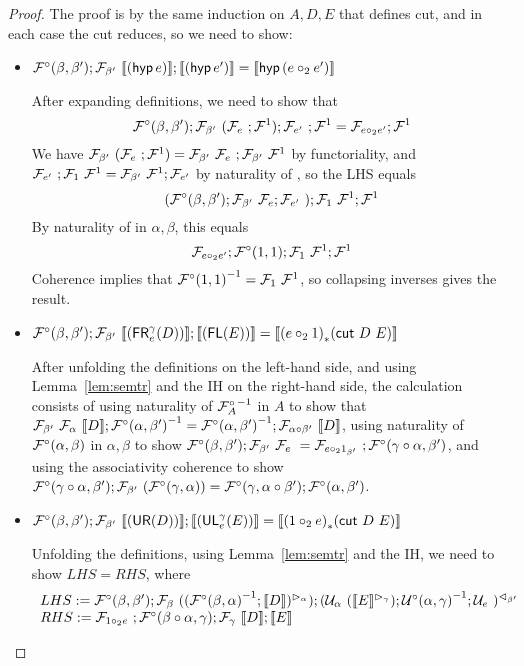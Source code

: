 \documentclass{drl-common/llncs}
\renewcommand{\sem}[1]{\ensuremath{ \llbracket #1 \rrbracket}}
\newcommand{\inv}[1]{\ensuremath{{#1}^{-1}}}
\newcommand\compo[2]{\ensuremath{#1 \circ #2}}
\newcommand\comph[2]{\ensuremath{#1 \mathbin{\circ_2} #2}}
\newcommand\tr[2]{\ensuremath{{{#1}_{*}(#2)}}}
\newcommand\cutsym{\ensuremath{\dsd{cut}}}
\newcommand\cut[2]{\ensuremath{{\cutsym \,\, #1 \,\, #2}}}
\newcommand\hyp[1]{\ensuremath{\dsd{hyp} \, {#1}}}
\newcommand\UL[3]{\ensuremath{\dsd{UL}^{#1}_{#2}(#3)}}
\newcommand\FR[3]{\ensuremath{\dsd{FR}^{#1}_{#2}(#3)}}
\newcommand\FL[1]{\ensuremath{\dsd{FL}(#1)}}
\newcommand\UR[1]{\ensuremath{\dsd{UR}(#1)}}
\begin{document}
\begin{proof}

The proof is by the same induction on $A,D,E$ that defines cut, and in
each case the cut reduces, so we need to show:

\begin{itemize}
\item $\semofcut {(\hyp e)} {(\hyp {e'})} = \sem{\hyp {(\comph{e}{e'})}}$

After expanding definitions, we need to show that
\[
\semFcomp(\beta,\beta');\semF{\beta'}{(\semF{e};\semFone)};\semF{e'};\semFone = \semFo{\comph{e}{e'}};\semFone
\]
We have $\mathcal{F}_{\beta'} \,\, (\mathcal{F}_{e} \,\, ;{\mathcal{F}^1}) =
\mathcal{F}_{\beta'} \,\, \mathcal{F}_{e} \,\, ;\mathcal{F}_{\beta'} \,\, {\mathcal{F}^1}$ by functoriality, and $\mathcal{F}_{e'} \,\, ;{\mathcal{F}_{1} \,\, {\mathcal{F}^1}} =
\mathcal{F}_{\beta'} \,\, {\mathcal{F}^1};{\mathcal{F}_{e'}}$ by naturality of ,
so the LHS equals
\[
(\mathcal{F}^\circ(\beta,\beta');\mathcal{F}_{\beta'} \,\, {\mathcal{F}_{e}};\mathcal{F}_{e'} \,\, );{\mathcal{F}_{1} \,\, {\mathcal{F}^1}};{\mathcal{F}^1}
\]
By naturality of \semFcomp in $\alpha,\beta$, this equals
\[
\semFo{\comph{e}{e'}};\semFcomp(1,1);{\semF{1}{\semFone}};\semFone
\]
Coherence implies that $\inv{\semFcomp(1,1)} = \semF{1}{\semFone}$, so
collapsing inverses gives the result.  

\item $\semofcut {(\FR \gamma e D)} {(\FL E)} = \sem{ \tr {(\comph{e}{1})} {\cut D E} }$

After unfolding the definitions on the left-hand side, and using
Lemma~\ref{lem:semtr} and the IH on the right-hand side, 
the calculation consists of using naturality of $\inv{\semFcomp_A}$ in $A$ to
show that $\semF{\beta'}{\semF{\alpha}{\sem
    D}};\inv{\semFcomp(\alpha,\beta')} =
\inv{\semFcomp(\alpha,\beta')};\semF{\compo \alpha \beta'}{\sem{D}}$,
using naturality of $\mathcal{F}^\circ(\alpha,\beta)$ in $\alpha,\beta$ to
show 
$\semFcomp(\beta,\beta');\semF{\beta'}{\semF{e}} =
\semF{\comph{e}{1_{\beta'}}};\semFcomp(\compo{\gamma}{\alpha},\beta')$, 
and using the associativity coherence to show
$\semFcomp(\compo{\gamma}{\alpha},\beta');\semF{\beta'}{(\semFcomp(\gamma,\alpha))}
= \semFcomp(\gamma,\compo{\alpha}{\beta'});\semFcomp(\alpha,\beta')$.

\item $\semofcut {(\UR D)} {(\UL \gamma e E)} = \sem{\tr {(\comph{1}{e})} {\cut D E}}$

Unfolding the definitions, using Lemma~\ref{lem:semtr} and the IH, we
need to show $LHS = RHS$, where
\[
\begin{array}{l}
LHS := \semFcomp(\beta,\beta');\semF{\beta}{(\semltor{(\inv{\semFcomp(\beta,\alpha)};\sem{D})}{\alpha}  )};
\semrtol{(\semU{\alpha}{(\semltor{\sem{E}}{\gamma})};\inv{\semUcomp(\alpha,\gamma)};\semU{e})}{\beta'}\\
RHS := \semF{\comph{1}{e}};\semFcomp(\compo{\beta}{\alpha},\gamma);\semF{\gamma}{\sem{D}};\sem{E}
\end{array}
\]


\end{itemize}
\end{proof}
\end{document}
